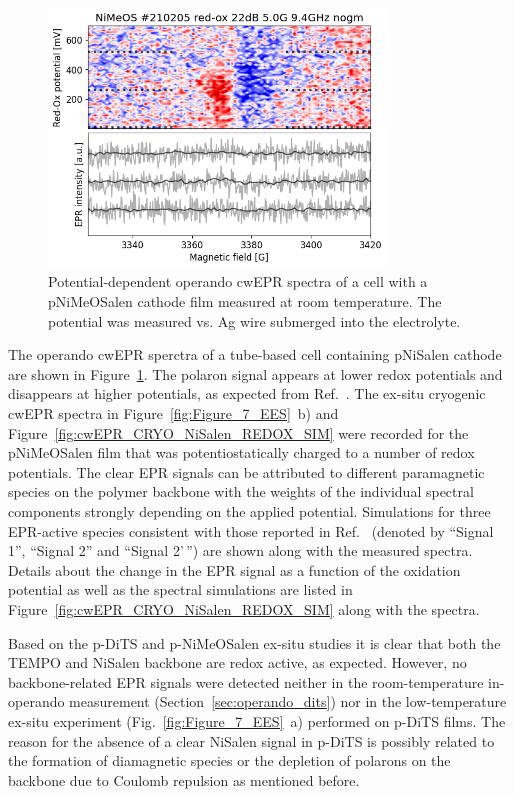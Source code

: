 \begin{figure}[h]
\center
	\includegraphics[width=0.8\textwidth]{./operando_epr/figures/backbone/NiMeOS_lyra_overnight_RT.png}
	\caption{Potential-dependent operando cwEPR spectra of a cell with a pNiMeOSalen cathode film measured at room temperature. The potential was measured vs. Ag wire submerged into the electrolyte.}
	\label{fig:cwEPR_RT_NiSalen_OPERANDO}
\end{figure}

\par

The operando cwEPR sperctra of a tube-based cell containing pNiSalen cathode are shown in Figure~\ref{fig:cwEPR_RT_NiSalen_OPERANDO}. The polaron signal appears at lower redox potentials and disappears at higher potentials, as expected from Ref.~\cite{Dmitrieva2018}. The ex-situ cryogenic cwEPR spectra in Figure~\ref{fig:Figure_7_EES}~b) and Figure~\ref{fig:cwEPR_CRYO_NiSalen_REDOX_SIM} were recorded for the pNiMeOSalen film that was potentiostatically charged to a number of redox potentials. The clear EPR signals can be attributed to different paramagnetic species on the polymer backbone with the weights of the individual spectral components strongly depending on the applied potential. Simulations for three EPR-active species consistent with those reported in Ref.~\cite{Dmitrieva2018} (denoted by ``Signal 1'', ``Signal 2'' and ``Signal 2'\,'') are shown along with the measured spectra. Details about the change in the EPR signal as a function of the oxidation potential as well as the spectral simulations are listed in Figure~\ref{fig:cwEPR_CRYO_NiSalen_REDOX_SIM} along with the spectra.

%
\par
Based on the p-DiTS and p-NiMeOSalen ex-situ studies it is clear that both the TEMPO and NiSalen backbone are redox active, as expected. However, no backbone-related EPR signals were detected neither in the room-temperature in-operando measurement (Section~\ref{sec:operando_dits}) nor in the low-temperature ex-situ experiment (Fig.~\ref{fig:Figure_7_EES}~a) performed on p-DiTS films. The reason for the absence of a clear NiSalen signal in p-DiTS is possibly related to the formation of diamagnetic species or the depletion of polarons on the backbone due to Coulomb repulsion as mentioned before.


